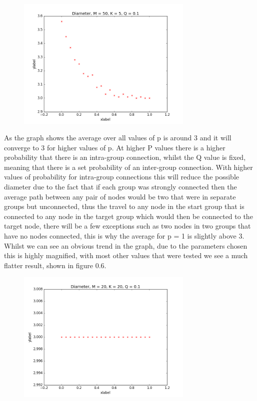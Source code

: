 \documentclass[paper=a4, fontsize=11pt]{scrartcl}
\numberwithin{equation}{section}		%
\numberwithin{figure}{section}			%
\numberwithin{table}{section}				%
\begin{document}
\begin{figure}[h]
\center
\caption{}
\includegraphics[width=0.75\textwidth]{pictures/diameter.png}
\end{figure}

As the graph shows the average over all values of p is around 3 and it will converge to 3 for higher values of p. At higher P values there is a higher probability that there is an intra-group connection, whilst the Q value is fixed, meaning that there is a set probability of an inter-group connection. With higher values of probability for intra-group connections this will reduce the possible diameter due to the fact that if each group was strongly connected then the average path between any pair of nodes would be two that were in separate groups but unconnected, thus the travel to any node in the start group that is connected to any node in the target group which would then be connected to the target node, there will be a few exceptions such as two nodes in two groups that have no nodes connected, this is why the average for p = 1 is slightly above 3. Whilst we can see an obvious trend in the graph, due to the parameters chosen this is highly magnified, with most other values that were tested we see a much flatter result, shown in figure 0.6.

\begin{figure}[h]
\center
\caption{}
\includegraphics[width=0.75\textwidth]{pictures/otherD.png}
\end{figure}
\end{document}
